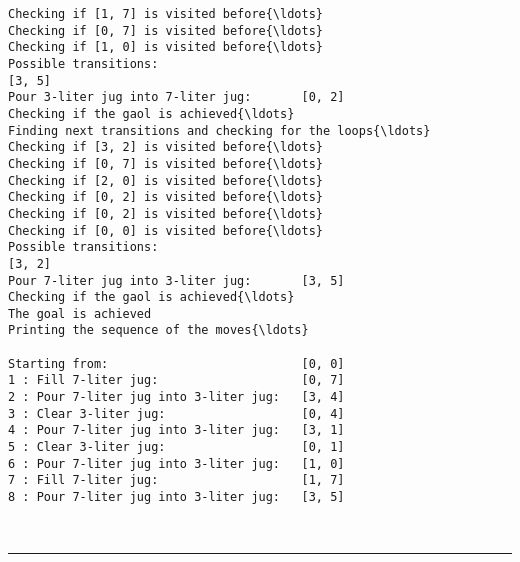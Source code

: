 \documentclass[11pt]{article}
\begin{document}
\begin{Verbatim}[commandchars=\\\{\}]
Checking if [1, 7] is visited before{\ldots}
Checking if [0, 7] is visited before{\ldots}
Checking if [1, 0] is visited before{\ldots}
Possible transitions:
[3, 5]
Pour 3-liter jug into 7-liter jug:       [0, 2]
Checking if the gaol is achieved{\ldots}
Finding next transitions and checking for the loops{\ldots}
Checking if [3, 2] is visited before{\ldots}
Checking if [0, 7] is visited before{\ldots}
Checking if [2, 0] is visited before{\ldots}
Checking if [0, 2] is visited before{\ldots}
Checking if [0, 2] is visited before{\ldots}
Checking if [0, 0] is visited before{\ldots}
Possible transitions:
[3, 2]
Pour 7-liter jug into 3-liter jug:       [3, 5]
Checking if the gaol is achieved{\ldots}
The goal is achieved
Printing the sequence of the moves{\ldots}

Starting from:                           [0, 0]
1 : Fill 7-liter jug:                    [0, 7]
2 : Pour 7-liter jug into 3-liter jug:   [3, 4]
3 : Clear 3-liter jug:                   [0, 4]
4 : Pour 7-liter jug into 3-liter jug:   [3, 1]
5 : Clear 3-liter jug:                   [0, 1]
6 : Pour 7-liter jug into 3-liter jug:   [1, 0]
7 : Fill 7-liter jug:                    [1, 7]
8 : Pour 7-liter jug into 3-liter jug:   [3, 5]
    \end{Verbatim}

    ~\\
    \noindent\rule{16.5cm}{0.4pt}

    
    
    
\end{document}
